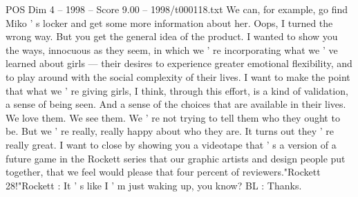 \begin{textsample}{POS Dim 4 – 1998 – Score 9.00 – 1998/t000118.txt}
We can, for example, go find Miko ' s locker and get some more information about her.
Oops, I turned the wrong way.
But you get the general idea of the product.
I wanted to show you the ways, innocuous as they seem, in which we ' re incorporating what we ' ve learned about girls — their desires to experience greater emotional flexibility, and to play around with the social complexity of their lives.
I want to make the point that what we ' re giving girls, I think, through this effort, is a kind of validation, a sense of being seen.
And a sense of the choices that are available in their lives.
We love them.
We see them.
We ' re not trying to tell them who they ought to be.
But we ' re really, really happy about who they are.
It turns out they ' re really great.
I want to close by showing you a videotape that ' s a version of a future game in the Rockett series that our graphic artists and design people put together, that we feel would please that four percent of reviewers."Rockett 28!"Rockett : It ' s like I ' m just waking up, you know?
BL : Thanks.

\end{textsample}
